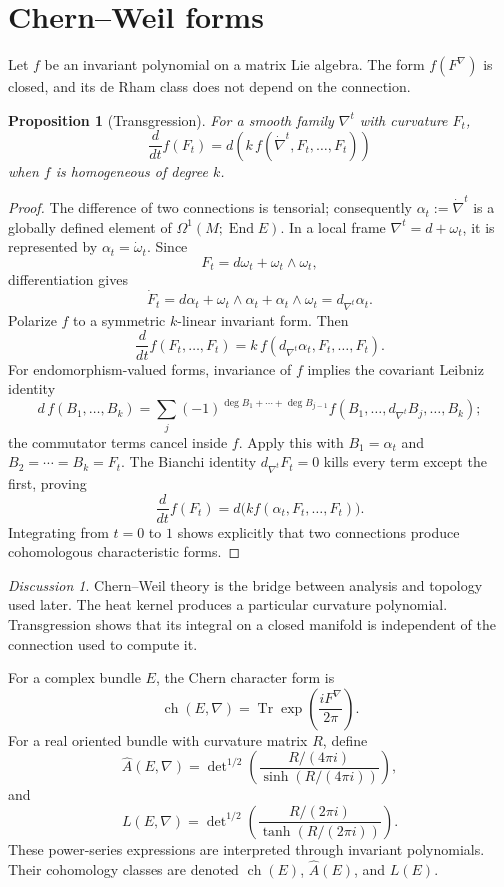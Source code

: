 \documentclass[11pt,oneside,reqno]{book}
\DeclareMathOperator{\Tr}{Tr}
\newcommand{\Ahat}{\widehat A}
\theoremstyle{plain}
\newtheorem{proposition}[theorem]{Proposition}
\theoremstyle{definition}
\theoremstyle{remark}
\newtheorem*{discussion}{Discussion}
\begin{document}
\section{Chern--Weil forms}

Let \(f\) be an invariant polynomial on a matrix Lie algebra. The form
\(f(F^\nabla)\) is closed, and its de Rham class does not depend on the
connection.

\begin{proposition}[Transgression]
For a smooth family \(\nabla^t\) with curvature \(F_t\),
\[
 \frac{d}{dt}f(F_t)
 =
 d\!\left(
 k\,f(\dot\nabla^t,F_t,\ldots,F_t)
 \right)
\]
when \(f\) is homogeneous of degree \(k\).
\end{proposition}

\begin{proof}
The difference of two connections is tensorial; consequently
\(\alpha_t:=\dot\nabla^t\) is a globally defined element of
\(\Omega^1(M;\operatorname{End}E)\).  In a local frame
\(\nabla^t=d+\omega_t\), it is represented by
\(\alpha_t=\dot\omega_t\). Since
\[
 F_t=d\omega_t+\omega_t\wedge\omega_t,
\]
differentiation gives
\[
 \dot F_t=d\alpha_t+\omega_t\wedge\alpha_t+\alpha_t\wedge\omega_t
 =d_{\nabla^t}\alpha_t.
\]
Polarize \(f\) to a symmetric \(k\)-linear invariant form. Then
\[
 \frac d{dt}f(F_t,\ldots,F_t)
 =k\,f(d_{\nabla^t}\alpha_t,F_t,\ldots,F_t).
\]
For endomorphism-valued forms, invariance of \(f\) implies the covariant
Leibniz identity
\[
 d\,f(B_1,\ldots,B_k)
 =
 \sum_j(-1)^{\deg B_1+\cdots+\deg B_{j-1}}
 f(B_1,\ldots,d_{\nabla^t}B_j,\ldots,B_k);
\]
the commutator terms cancel inside \(f\). Apply this with
\(B_1=\alpha_t\) and \(B_2=\cdots=B_k=F_t\). The Bianchi identity
\(d_{\nabla^t}F_t=0\) kills every term except the first, proving
\[
 \frac d{dt}f(F_t)
 =d\bigl(kf(\alpha_t,F_t,\ldots,F_t)\bigr).
\]
Integrating from \(t=0\) to \(1\) shows explicitly that two connections
produce cohomologous characteristic forms.
\end{proof}

\begin{discussion}
Chern--Weil theory is the bridge between analysis and topology used later.
The heat kernel produces a particular curvature polynomial. Transgression
shows that its integral on a closed manifold is independent of the
connection used to compute it.
\end{discussion}

For a complex bundle \(E\), the Chern character form is
\[
 \operatorname{ch}(E,\nabla)
 =
 \Tr\exp\!\left(\frac{iF^\nabla}{2\pi}\right).
\]
For a real oriented bundle with curvature matrix \(R\), define
\[
 \Ahat(E,\nabla)
 =
 \det\nolimits^{1/2}
 \left(
 \frac{R/(4\pi i)}{\sinh(R/(4\pi i))}
 \right),
\]
and
\[
 L(E,\nabla)
 =
 \det\nolimits^{1/2}
 \left(
 \frac{R/(2\pi i)}{\tanh(R/(2\pi i))}
 \right).
\]
These power-series expressions are interpreted through invariant
polynomials. Their cohomology classes are denoted
\(\operatorname{ch}(E)\), \(\Ahat(E)\), and \(L(E)\).
\end{document}
